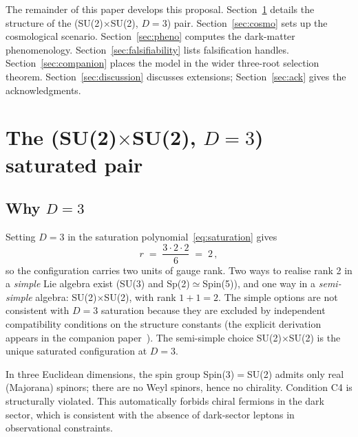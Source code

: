 \documentclass[aps,prd,twocolumn,nofootinbib,superscriptaddress,floatfix]{revtex4-2}
\begin{document}
The remainder of this paper develops this proposal. Section~\ref{sec:pair} details the structure of the (SU(2)$\times$SU(2), $D=3$) pair. Section~\ref{sec:cosmo} sets up the cosmological scenario. Section~\ref{sec:pheno} computes the dark-matter phenomenology. Section~\ref{sec:falsifiability} lists falsification handles. Section~\ref{sec:companion} places the model in the wider three-root selection theorem. Section~\ref{sec:discussion} discusses extensions; Section~\ref{sec:ack} gives the acknowledgments.

\section{The (SU(2)$\times$SU(2), $D=3$) saturated pair}
\label{sec:pair}

\subsection{Why $D=3$}
Setting $D=3$ in the saturation polynomial~\eqref{eq:saturation} gives
\begin{equation}
    r \;=\; \frac{3 \cdot 2 \cdot 2}{6} \;=\; 2\,,
\end{equation}
so the configuration carries two units of gauge rank. Two ways to realise rank 2 in a \emph{simple} Lie algebra exist (SU(3) and Sp(2)$\simeq$Spin(5)), and one way in a \emph{semi-simple} algebra: SU(2)$\times$SU(2), with rank $1+1=2$. The simple options are not consistent with $D=3$ saturation because they are excluded by independent compatibility conditions on the structure constants (the explicit derivation appears in the companion paper~\cite{Remondiere2026companion}). The semi-simple choice SU(2)$\times$SU(2) is the unique saturated configuration at $D=3$.

In three Euclidean dimensions, the spin group Spin(3)$=$SU(2) admits only real (Majorana) spinors; there are no Weyl spinors, hence no chirality. Condition C4 is structurally violated. This automatically forbids chiral fermions in the dark sector, which is consistent with the absence of dark-sector leptons in observational constraints.
\end{document}

